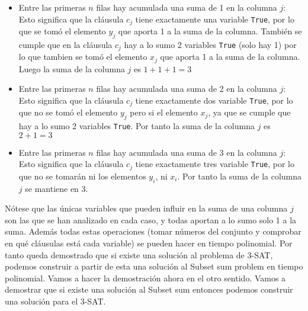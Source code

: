 \documentclass[11pt]{article}
\begin{document}
    \begin{itemize}
        \item Entre las primeras $n$ filas hay acumulada una suma de 1 en la columna $j$: Esto significa que la cláusula
              $c_j$ tiene exactamente una variable \texttt{True}, por lo que se tomó el elemento $y_j$ que aporta 1 a la
              suma de la columna. También se cumple que en la cláusula $c_j$ hay a lo sumo 2 variables \texttt{True} (solo
              hay 1) por lo que tambien se tomó el elemento $x_j$ que aporta 1 a la suma de la columna. Luego la suma de la
              columna $j$ es $1 + 1 + 1 = 3$
        \item Entre las primeras $n$ filas hay acumulada una suma de 2 en la columna $j$: Esto significa que la cláusula
              $c_j$ tiene exactamente dos variable \texttt{True}, por lo que no se tomó el elemento $y_j$ pero si el elemento $x_j$,
              ya que se cumple que hay a lo sumo 2 variables \texttt{True}. Por tanto la suma de la columna $j$ es $2 + 1 = 3$
        \item Entre las primeras $n$ filas hay acumulada una suma de 3 en la columna $j$: Esto significa que la cláusula
              $c_j$ tiene exactamente tres variable \texttt{True}, por lo que no se tomarán ni los elementos $y_i$, ni $x_i$.
              Por tanto la suma de la columna $j$ se mantiene en 3.
    \end{itemize}

    Nótese que las únicas variables que pueden influir en la suma de una columna $j$ son las que se han analizado
    en cada caso, y todas aportan a lo sumo solo 1 a la suma. Además todas estas operaciones (tomar números del conjunto
    y comprobar en qué cláusulas está cada variable) se pueden hacer en tiempo polinomial. Por tanto queda demostrado que 
    si existe una solución al problema de 3-SAT, podemos construir a partir de esta una solución al Subset sum problem
    en tiempo polinomial. Vamos a hacer la demostración ahora en el otro sentido. Vamos a demostrar que si existe una 
    solución al Subset sum entonces podemos construir una solución para el 3-SAT.\\[10pt]
\end{document}
